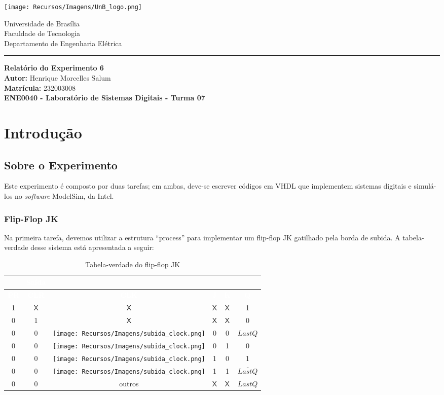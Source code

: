 \documentclass[a4paper,12pt]{article}
\newcommand{\capa}{
    \begin{titlepage}
        \begin{multicols}{2}
            \begin{flushleft}
                \texttt{[image: Recursos/Imagens/UnB\_logo.png]}
            \end{flushleft}
            \columnbreak
            \begin{flushright}
                Universidade de Brasília \\
                Faculdade de Tecnologia \\
                Departamento de Engenharia Elétrica
            \end{flushright}
        \end{multicols}
        \begin{center}
        \vspace{-20pt}
        \rule{\textwidth}{0.4pt}
        \end{center}
        \vspace{0.6cm}
        \begin{center}
            {\Huge \textbf{Relatório do Experimento 6}} \\[1em]
            {\large \textbf{Autor:} Henrique Morcelles Salum} \\[0.5em]
            {\large \textbf{Matrícula:} 232003008} \\
            \vfill
            {\large \textbf{ENE0040 - Laboratório de Sistemas Digitais - Turma 07}} \\
        \end{center}
    \end{titlepage}
}
\begin{document}
\capa

\newpage
\tableofcontents
\newpage

\section{Introdução}

\subsection{Sobre o Experimento}
Este experimento é composto por duas tarefas; em ambas, deve-se escrever códigos em VHDL que implementem sistemas digitais e simulá-los no \textit{software} ModelSim, da Intel.

\subsubsection{Flip-Flop JK}
Na primeira tarefa, devemos utilizar a estrutura ``process'' para implementar um flip-flop JK gatilhado pela borda de subida. A tabela-verdade desse sistema está apresentada a seguir:
\begin{table}[H]
    \centering
    \footnotesize
    \begin{tabular}{|c|c|c|c|c|c|}
        \hline
        \rowcolor{black}
        \multicolumn{5}{|c|}{\textbf{\textcolor{white}{Entradas}}} & \multicolumn{1}{|c|}{\textbf{\textcolor{white}{Saída}}} \\ \hline
        \rowcolor{black}
        \textcolor{white}{\textbf{PR}} & \textcolor{white}{\textbf{CLR}} & \textcolor{white}{\textbf{CLK}} & \textcolor{white}{\textbf{J}} & \textcolor{white}{\textbf{K}} & \textcolor{white}{\textbf{Q}} \\ \hline
        1 & $\mathsf{X}$ & $\mathsf{X}$ & $\mathsf{X}$ & $\mathsf{X}$ & 1 \\ \hline
        \rowcolor{cinza}
        0 & 1 & $\mathsf{X}$ & $\mathsf{X}$ & $\mathsf{X}$ & 0 \\ \hline
        0 & 0 & \texttt{[image: Recursos/Imagens/subida\_clock.png]} & 0 & 0 & $LastQ$ \\ \hline
        \rowcolor{cinza}
        0 & 0 & \texttt{[image: Recursos/Imagens/subida\_clock.png]} & 0 & 1 & 0 \\ \hline
        0 & 0 & \texttt{[image: Recursos/Imagens/subida\_clock.png]} & 1 & 0 & 1 \\ \hline
        \rowcolor{cinza}
        0 & 0 & \texttt{[image: Recursos/Imagens/subida\_clock.png]} & 1 & 1 & $\overline{LastQ}$\\ \hline
        0 & 0 & outros & $\mathsf{X}$ & $\mathsf{X}$ & $LastQ$\\ \hline
    \end{tabular}
    \caption{Tabela-verdade do flip-flop JK}
    \label{tab: q1_1}
\end{table}
\end{document}
